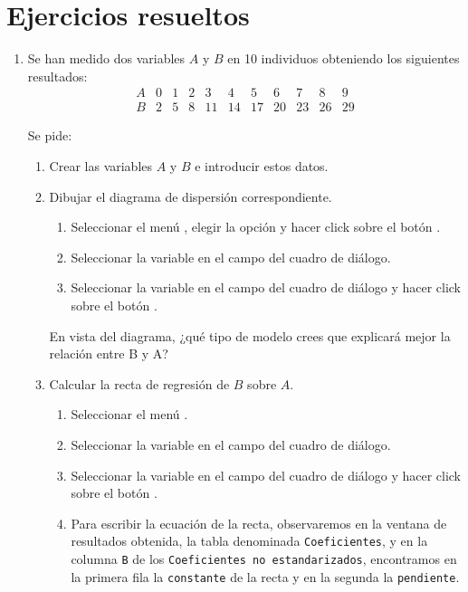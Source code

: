 \section{Ejercicios resueltos}
\begin{enumerate}[leftmargin=*]
\item Se han medido dos variables $A$ y $B$ en 10 individuos
obteniendo los siguientes resultados:
\[
\begin{array}{c|cccccccccc}
A& 0 & 1 & 2 & 3 & 4 & 5 & 6 & 7 & 8 & 9 \\
\hline 
B & 2 & 5 & 8 & 11 & 14 & 17 & 20 & 23 & 26 & 29
\end{array}
\]

Se pide:

\begin{enumerate}
\item  Crear las variables $A$ y $B$ e introducir estos datos.
\item  Dibujar el diagrama de dispersión correspondiente.
\begin{indicacion}
\begin{enumerate}
\item Seleccionar el menú , elegir la opción  y  
hacer click sobre el botón . 
\item Seleccionar la variable  en el campo  
del cuadro de diálogo. 
\item Seleccionar la variable  en el campo  
del cuadro de diálogo y hacer click sobre el botón .
\end{enumerate}
\end{indicacion}

En vista del diagrama, ¿qué tipo de modelo crees que explicará mejor 
la relación entre B y A?

\item Calcular la recta de regresión de $B$ sobre $A$.
\begin{indicacion}
\begin{enumerate}
\item Seleccionar el menú .
\item Seleccionar la variable  en el campo 
 del cuadro de diálogo.
\item Seleccionar la variable  en el campo 
 del cuadro de diálogo y hacer click sobre
el botón .
\item Para escribir la ecuación de la recta, observaremos en la ventana 
de resultados obtenida, la tabla denominada \texttt{Coeficientes}, y en 
la columna \texttt{B} de los \texttt{Coeficientes no estandarizados}, 
encontramos en la primera fila la \texttt{constante} de la recta y en 
la segunda la \texttt{pendiente}.
\end{enumerate}
\end{indicacion}


\end{enumerate}
\end{enumerate}
